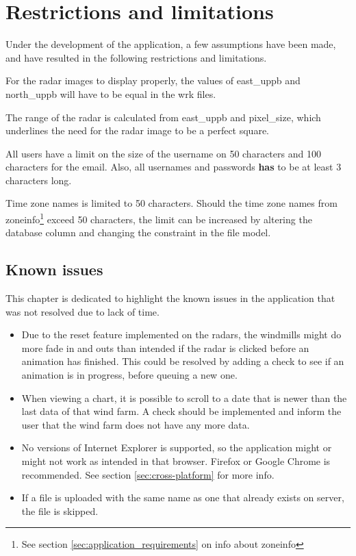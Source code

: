 \chapter{Restrictions and limitations}
Under the development of the application, a few assumptions have been made, and have resulted in the following restrictions and limitations.

For the radar images to display properly, the values of \textsf{east\_uppb} and \textsf{north\_uppb} will have to be equal in the \textsf{wrk} files.

The range of the radar is calculated from \textsf{east\_uppb} and \textsf{pixel\_size}, which underlines the need for the radar image to be a perfect square.

All users have a limit on the size of the username on 50 characters and 100 characters for the email.
Also, all usernames and passwords \textbf{has} to be at least 3 characters long.

Time zone names is limited to 50 characters. Should the time zone names from zoneinfo\footnote{See section \ref{sec:application_requirements} on info about zoneinfo} exceed 50 characters, the limit can be increased by altering the database column and changing the constraint in the file model.

\section{Known issues}
\label{sec:known_issues}
This chapter is dedicated to highlight the known issues in the application that was not resolved due to lack of time.
\begin{itemize}
\item Due to the reset feature implemented on the radars, the windmills might do more fade in and outs than intended if the radar is clicked before an animation has finished.
This could be resolved by adding a check to see if an animation is in progress, before queuing a new one.
\item When viewing a chart, it is possible to scroll to a date that is newer than the last data of that wind farm. A check should be implemented and inform the user that the wind farm does not have any more data.
\item No versions of Internet Explorer is supported, so the application might or might not work as intended in that browser. Firefox or Google Chrome is recommended. See section \ref{sec:cross-platform} for more info.
\item If a file is uploaded with the same name as one that already exists on server, the file is skipped.
\end{itemize}